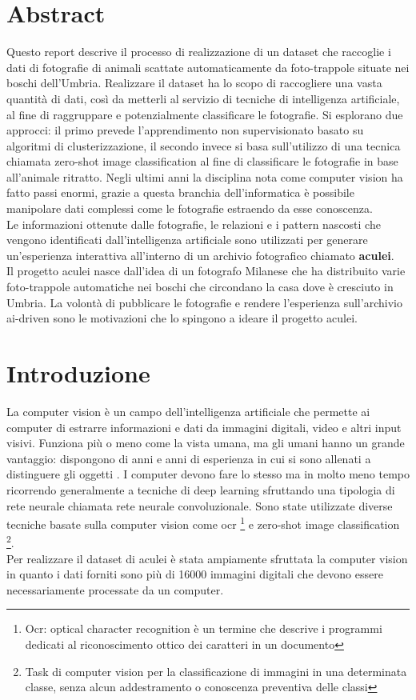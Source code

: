 \documentclass[12pt,a4paper,twoside]{article}
\begin{document}
\section*{Abstract}
Questo report descrive il processo di realizzazione di un dataset che raccoglie i dati di fotografie di animali scattate automaticamente da foto-trappole situate nei boschi dell'Umbria. Realizzare il dataset ha lo scopo di raccogliere una vasta quantità di dati, così da metterli al servizio di tecniche di intelligenza artificiale, al fine di raggruppare e potenzialmente classificare le fotografie. Si esplorano due approcci: il primo prevede l'apprendimento non supervisionato basato su algoritmi di clusterizzazione, il secondo invece si basa sull'utilizzo di una tecnica chiamata zero-shot image classification al fine di classificare le fotografie in base all'animale ritratto. Negli ultimi anni la disciplina nota come computer vision ha fatto passi enormi, grazie a questa branchia dell'informatica è possibile manipolare dati complessi come le fotografie estraendo da esse conoscenza. \\ Le informazioni ottenute dalle fotografie, le relazioni e i pattern nascosti che vengono identificati dall'intelligenza artificiale sono utilizzati per generare un'esperienza interattiva all'interno di un archivio fotografico chiamato \textbf{aculei}. \\ Il progetto aculei nasce dall'idea di un fotografo Milanese che ha distribuito varie foto-trappole automatiche nei boschi che circondano la casa dove è cresciuto in Umbria. La volontà di pubblicare le fotografie e rendere l'esperienza sull'archivio ai-driven sono le motivazioni che lo spingono a ideare il progetto aculei.

\section{Introduzione}
La computer vision è un campo dell'intelligenza artificiale che permette ai computer di estrarre informazioni e dati da immagini digitali, video e altri input visivi. Funziona più o meno come la vista umana, ma gli umani hanno un grande vantaggio: dispongono di anni e anni di esperienza in cui si sono allenati a distinguere gli oggetti \cite{ibm-comp-vision}. I computer devono fare lo stesso ma in molto meno tempo ricorrendo generalmente a tecniche di deep learning sfruttando una tipologia di rete neurale chiamata rete neurale convoluzionale. Sono state utilizzate diverse tecniche basate sulla computer vision come ocr \footnote{Ocr: optical character recognition è un termine che descrive i programmi dedicati al riconoscimento ottico dei caratteri in un documento} e zero-shot image classification \footnote{Task di computer vision per la classificazione di immagini in una determinata classe, senza alcun addestramento o conoscenza preventiva delle classi}. \\ Per realizzare il dataset di aculei è stata ampiamente sfruttata la computer vision in quanto i dati forniti sono più di 16000 immagini digitali che devono essere necessariamente processate da un computer.
\end{document}
